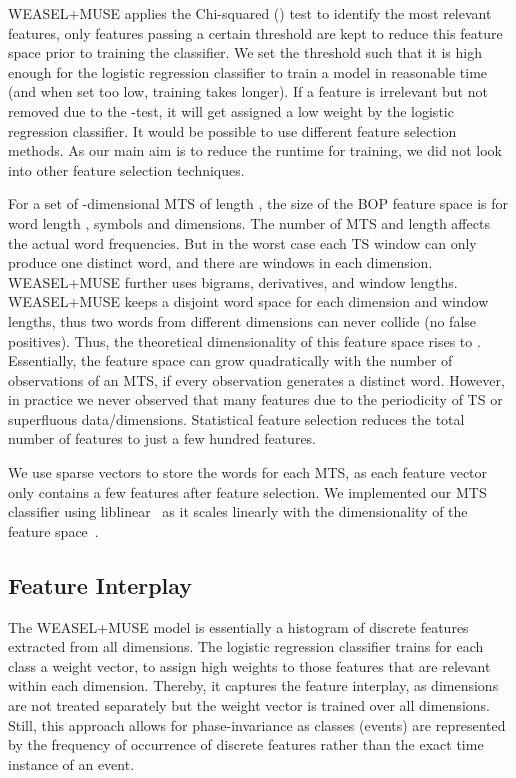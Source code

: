 \documentclass[sigconf]{acmart}
\begin{document}
WEASEL+MUSE applies the Chi-squared () test to identify the most relevant features, only features passing a certain threshold are kept to reduce this feature space prior to training the classifier. We set the threshold such that it is high enough for the logistic regression classifier to train a model in reasonable time (and when set too low, training takes longer). If a feature is irrelevant but not removed due to the -test, it will get assigned a low weight by the logistic regression classifier. It would be possible to use different feature selection methods. As our  main aim is to reduce the runtime for training, we did not look into other feature selection techniques.

For a set of  -dimensional MTS of length , the size of the BOP feature space is  for word length ,   symbols and  dimensions. The number of MTS  and length  affects the actual word frequencies. But in the worst case each TS window can only produce one distinct word, and there are  windows in each dimension. WEASEL+MUSE further uses bigrams, derivatives, and  window lengths. WEASEL+MUSE keeps a disjoint word space for each dimension and window lengths, thus two words from different dimensions can never collide (no false positives). Thus, the theoretical dimensionality of this feature space rises to . Essentially, the feature space can grow quadratically with the number of observations of an MTS, if every observation generates a distinct word. However, in practice we never observed that many features due to the periodicity of TS or superfluous data/dimensions. Statistical feature selection reduces the total number of features to just a few hundred features.

We use sparse vectors to store the words for each MTS, as each feature vector only contains a few features after feature selection. We implemented our MTS classifier using liblinear~\cite{fan2008liblinear} as it scales linearly with the dimensionality of the feature space~\cite{ng2004feature}.

\subsection{Feature Interplay}\label{subsec:Feature-interplay}

The WEASEL+MUSE model is essentially a histogram of discrete features extracted from all dimensions. The logistic regression classifier trains for each class a weight vector, to assign high weights to those features that are relevant within each dimension. Thereby, it captures the feature interplay, as dimensions are not treated separately but the weight vector is trained over all dimensions. Still, this approach allows for phase-invariance as classes (events) are represented by the frequency of occurrence of discrete features rather than the exact time instance of an event.
\end{document}
